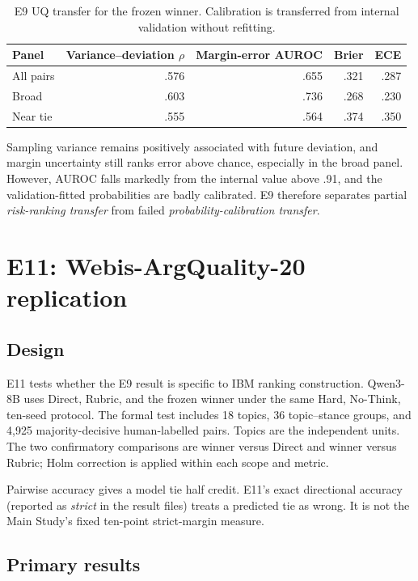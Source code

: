 \documentclass[11pt,twoside,a4paper]{report}
\begin{document}
\begin{table}[htbp]
\centering
\caption{E9 UQ transfer for the frozen winner.  Calibration is transferred from
internal validation without refitting.}
\label{tab:e9-uq}
\begin{tabular}{lrrrr}
\toprule
Panel & Variance--deviation $\rho$ & Margin-error AUROC & Brier & ECE \\
\midrule
All pairs & .576 & .655 & .321 & .287 \\
Broad & .603 & .736 & .268 & .230 \\
Near tie & .555 & .564 & .374 & .350 \\
\bottomrule
\end{tabular}
\end{table}

Sampling variance remains positively associated with future deviation, and margin
uncertainty still ranks error above chance, especially in the broad panel.  However,
AUROC falls markedly from the internal value above .91, and the validation-fitted
probabilities are badly calibrated.  E9 therefore separates partial
\emph{risk-ranking transfer} from failed \emph{probability-calibration transfer}.

\section{E11: Webis-ArgQuality-20 replication}
\label{sec:e11}

\subsection{Design}

E11 tests whether the E9 result is specific to IBM ranking construction.  Qwen3-8B
uses Direct, Rubric, and the frozen winner under the same Hard, No-Think, ten-seed
protocol.  The formal test includes 18 topics, 36 topic--stance groups, and 4,925
majority-decisive human-labelled pairs.  Topics are the independent units.
The two confirmatory comparisons are winner versus Direct and winner versus Rubric;
Holm correction is applied within each scope and metric.

Pairwise accuracy gives a model tie half credit.  E11's exact directional accuracy
(reported as \emph{strict} in the result files) treats a predicted tie as wrong.  It
is not the Main Study's fixed ten-point strict-margin measure.

\subsection{Primary results}
\end{document}
